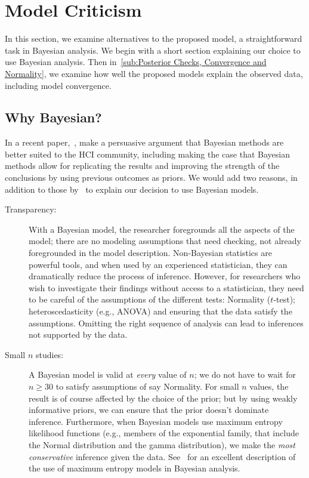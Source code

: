 \section{Model Criticism}
\label{sec:Model Criticism}

In this section, we examine alternatives to the proposed model, a straightforward task in Bayesian analysis. We begin with a short section explaining our choice to use Bayesian analysis. Then in~\ref{sub:Posterior Checks, Convergence and Normality}, we examine how well the proposed models explain the observed data, including model convergence.

\subsection{Why Bayesian?}
\label{sub:Why Bayesian?}
In a recent paper,~\textcite{Kay2016}, make a persuasive argument that Bayesian methods are better suited to the HCI community, including making the case that Bayesian methods allow for replicating the results and improving the strength of the conclusions by using previous outcomes as priors. We would add two reasons, in addition to those by~\textcite{Kay2016} to explain our decision to use Bayesian models. 
\begin{description}
    \item[Transparency:] With a Bayesian model, the researcher foregrounds all the aspects of the model; there are no modeling assumptions that need checking, not already foregrounded in the model description. Non-Bayesian statistics are powerful tools, and when used by an experienced statistician, they can dramatically reduce the process of inference. However, for researchers who wish to investigate their findings without access to a statistician, they need to be careful of the assumptions of the different tests: Normality ($t$-test); heteroscedasticity (e.g., ANOVA) and ensuring that the data satisfy the assumptions. Omitting the right sequence of analysis can lead to inferences not supported by the data.
    \item[Small $n$ studies:] A Bayesian model is valid at \textit{every} value of $n$; we do not have to wait for $n\geq 30$ to satisfy assumptions of say Normality. For small $n$ values, the result is of course affected by the choice of the prior; but by using weakly informative priors, we can ensure that the prior doesn't dominate inference. Furthermore, when Bayesian models use maximum entropy likelihood functions (e.g., members of the exponential family, that include the Normal distribution and the gamma distribution), we make the \textit{most conservative} inference given the data. See~\textcite[][Chapter 9]{McElreath2015} for an excellent description of the use of maximum entropy models in Bayesian analysis.
\end{description}


